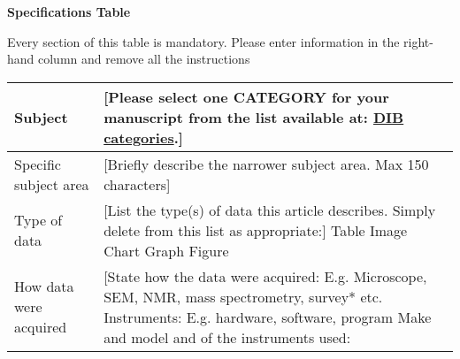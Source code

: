 \documentclass[times,final]{elsarticle}
\begin{document}
{\fontsize{7.5pt}{9pt}\selectfont
\noindent\textbf{Specifications Table}

Every section of this table is mandatory.
Please enter information in the right-hand column and remove all the instructions
\begin{longtable}{|p{33mm}|p{94mm}|}
\hline
\endhead
\hline
\endfoot
Subject                & [Please select one CATEGORY for your manuscript from the list
					               available at:\break
                         \href{https://www.elsevier.com/__data/assets/excel_doc/0012/736977/%
                               DIB-categories.xlsx}{DIB categories}.]\\
\hline
Specific subject area  & [Briefly describe the narrower subject area. Max 150 characters]\\
\hline
Type of data           & [List the type(s) of data this article describes.
                         Simply delete from this list as appropriate:]
                         Table\newline
                         Image\newline
                         Chart\newline
                         Graph\newline
                         Figure\\
How data were acquired & [State how the data were acquired: E.g. Microscope,
                         SEM, NMR, mass spectrometry, survey* etc.\newline
                         Instruments: E.g. hardware, software, program\newline
                         Make and model and of the instruments used:\newline


\end{longtable}}
\end{document}
